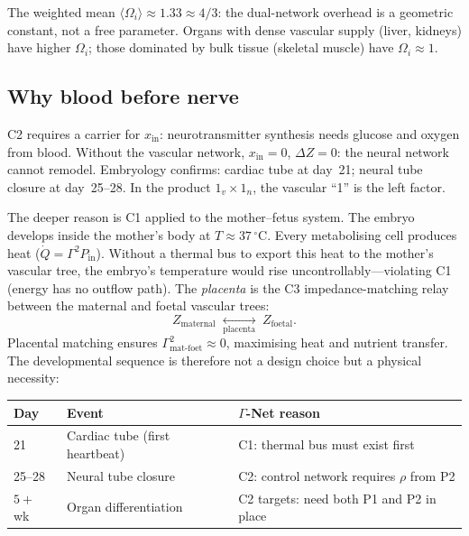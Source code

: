 \documentclass[aps,pre,twocolumn,superscriptaddress,floatfix]{revtex4-2}
\begin{document}
\noindent
The weighted mean $\langle\Omega_i\rangle \approx 1.33
\approx 4/3$: the dual-network overhead is a geometric
constant, not a free parameter.
Organs with dense vascular supply (liver, kidneys) have
higher $\Omega_i$; those dominated by bulk tissue
(skeletal muscle) have $\Omega_i \approx 1$.

\subsection{Why blood before nerve}

C2 requires a carrier for $x_{\text{in}}$:
neurotransmitter synthesis needs glucose and oxygen from
blood.
Without the vascular network, $x_{\text{in}} = 0$,
$\Delta Z = 0$: the neural network cannot remodel.
Embryology confirms: cardiac tube at day~21; neural tube
closure at day~25--28.
In the product $1_v \times 1_n$, the vascular ``1'' is
the left factor.

The deeper reason is C1 applied to the
mother--fetus system.
The embryo develops inside the mother's body
at $T \approx 37\,^{\circ}$C.
Every metabolising cell produces heat
($\dot{Q} = \Gamma^2 P_{\text{in}}$).
Without a thermal bus to export this heat to the
mother's vascular tree, the embryo's temperature
would rise uncontrollably---violating C1
(energy has no outflow path).
The \emph{placenta} is the C3 impedance-matching
relay between the maternal and foetal vascular trees:
\[
  Z_{\text{maternal}} \;\underset{\text{placenta}}
    {\longleftrightarrow}\; Z_{\text{foetal}}.
\]
Placental matching ensures $\Gamma^2_{\text{mat-foet}}
\approx 0$, maximising heat and nutrient transfer.
The developmental sequence is therefore not a design
choice but a physical necessity:
\begin{center}
\begin{tabular}{lll}
\toprule
Day & Event & $\Gamma$-Net reason \\
\midrule
21 & Cardiac tube (first heartbeat) &
  C1: thermal bus must exist first \\
25--28 & Neural tube closure &
  C2: control network requires $\rho$ from P2 \\
$5+$ wk & Organ differentiation &
  C2 targets: need both P1 and P2 in place \\
\bottomrule
\end{tabular}
\end{center}
\end{document}
